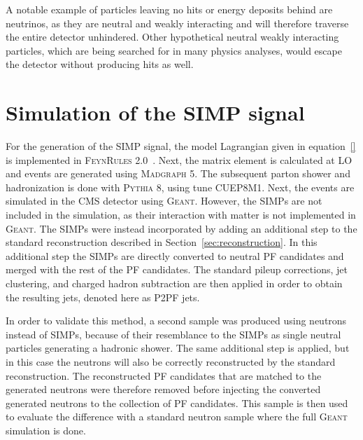 A notable example of particles leaving no hits or energy deposits behind are neutrinos, as they are neutral and weakly interacting and will therefore traverse the entire detector unhindered. Other hypothetical neutral weakly interacting particles, which are being searched for in many physics analyses, would escape the detector without producing hits as well.

\section{Simulation of the SIMP signal}
\label{sec:SIMPs}



For the generation of the \ac{SIMP} signal, the model Lagrangian given in equation~\ref{} is implemented in \textsc{FeynRules 2.0}~\cite{Alloul:2013bka}. Next, the matrix element is calculated at \ac{LO} and events are generated using \textsc{Madgraph 5}. The subsequent parton shower and hadronization is done with \textsc{Pythia 8}, using tune CUEP8M1. Next, the events are simulated in the \ac{CMS} detector using \textsc{Geant}. However, the \acp{SIMP} are not included in the simulation, as their interaction with matter is not implemented in \textsc{Geant}. The \acp{SIMP} were instead incorporated by adding an additional step to the standard reconstruction described in Section~\ref{sec:reconstruction}. In this additional step the \acp{SIMP} are directly converted to neutral \ac{PF} candidates and merged with the rest of the \ac{PF} candidates. The standard pileup corrections, jet clustering, and charged hadron subtraction are then applied in order to obtain the resulting jets, denoted here as P2PF jets.

In order to validate this method, a second sample was produced using neutrons instead of \acp{SIMP}, because of their resemblance to the \acp{SIMP} as single neutral particles generating a hadronic shower. The same additional step is applied, but in this case the neutrons will also be correctly reconstructed by the standard reconstruction. The reconstructed \ac{PF} candidates that are matched to the generated neutrons were therefore removed before injecting the converted generated neutrons to the collection of \ac{PF} candidates. This sample is then used to evaluate the difference with a standard neutron sample where the full \textsc{Geant} simulation is done.

